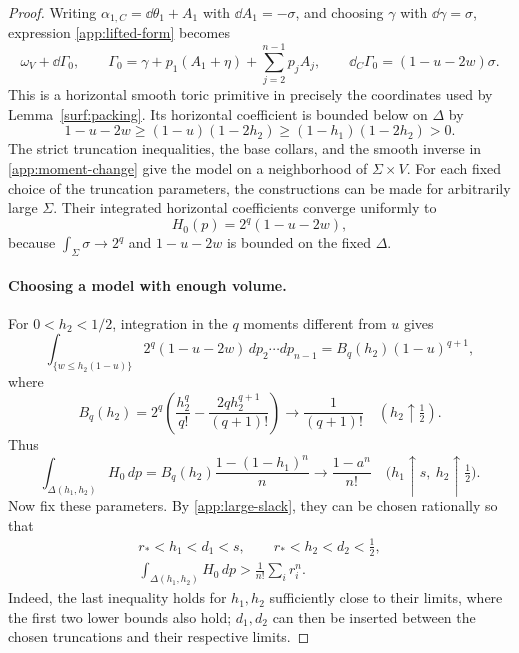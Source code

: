 \begin{proof}
Writing $\alpha_{1,C}=\dd\theta_1+A_1$ with $\dd A_1=-\sigma$, and choosing
$\gamma$ with $\dd\gamma=\sigma$, expression \eqref{app:lifted-form} becomes
\begin{equation}\label{app:large-surface-form}
 \omega_V+\dd\Gamma_0,\qquad
 \Gamma_0=\gamma+p_1(A_1+\eta)+\sum_{j=2}^{n-1}p_jA_j,\qquad
 \dd_C\Gamma_0=(1-u-2w)\sigma.
\end{equation}
This is a horizontal smooth toric primitive in precisely the coordinates
used by Lemma~\ref{surf:packing}. Its horizontal coefficient is bounded
below on $\Delta$ by
\begin{equation}\label{app:large-positive}
 1-u-2w\ge(1-u)(1-2h_2)
             \ge(1-h_1)(1-2h_2)>0.
\end{equation}
The strict truncation inequalities, the base collars, and the smooth
inverse in \eqref{app:moment-change} give the model on a neighborhood of
$\Sigma\times V$. For each fixed choice of the truncation parameters, the constructions
can be made for arbitrarily large $\Sigma$. Their integrated horizontal
coefficients converge uniformly to
\[
 H_0(p)=2^q(1-u-2w),
\]
because $\int_\Sigma\sigma\to2^q$ and $1-u-2w$ is bounded on the fixed
$\Delta$.

\paragraph{Choosing a model with enough volume.}
For $0<h_2<1/2$, integration in the $q$ moments different from $u$ gives
\[
 \int_{\{w\le h_2(1-u)\}}2^q(1-u-2w)\,dp_2\cdots dp_{n-1}
 =B_q(h_2)(1-u)^{q+1},
\]
where
\[
 B_q(h_2)=2^q\left(\frac{h_2^q}{q!}
             -\frac{2q h_2^{q+1}}{(q+1)!}\right)
 \longrightarrow\frac1{(q+1)!}\quad(h_2\uparrow\tfrac12).
\]
Thus
\begin{equation}\label{app:large-volume}
 \int_{\Delta(h_1,h_2)}H_0\,dp
 =B_q(h_2)\frac{1-(1-h_1)^n}{n}
 \longrightarrow\frac{1-a^n}{n!}
 \quad\bigl(h_1\uparrow s,\ h_2\uparrow\tfrac12\bigr).
\end{equation}
Now fix these parameters. By \eqref{app:large-slack}, they can be
chosen rationally so that
\begin{equation}\label{app:large-truncation}
 \begin{gathered}
 r_*<h_1<d_1<s,\qquad
 r_*<h_2<d_2<\tfrac12,\\
 \int_{\Delta(h_1,h_2)}H_0\,dp>
                 \frac1{n!}\sum_i r_i^n.
 \end{gathered}
\end{equation}
Indeed, the last inequality holds for $h_1,h_2$ sufficiently close to their
limits, where the first two lower bounds also hold; $d_1,d_2$ can then be
inserted between the chosen truncations and their respective limits.


\end{proof}

